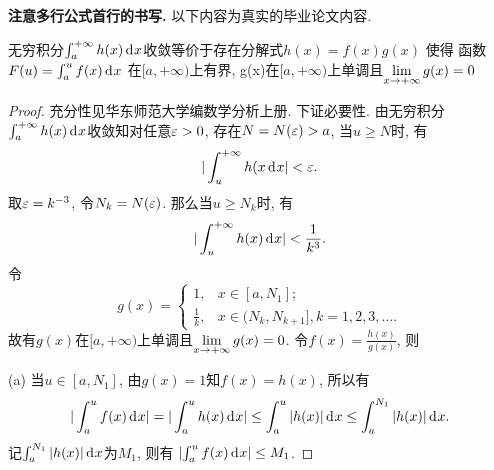 \documentclass[a4paper,12pt,twoside]{ctexart}
\begin{document}
    \textbf{注意多行公式首行的书写.} 以下内容为真实的毕业论文内容.
    \begin{theo}\label{theowom}
    无穷积分$\int_{a}^{+\infty}{h(x){\,\textup{d}}^{}x}$收敛等价于存在分解式$h(x)=f(x)g(x)$ 使得
    函数$F(u)=\int_{a}^{u}{f(x){\,\textup{d}}^{}x}$
    在$[a, +\infty)$上有界, g(x)在$[a, +\infty)$上单调且$\displaystyle\lim_{x\to+\infty}g(x)=0$
    \end{theo}

\begin{proof}
    充分性见华东师范大学编数学分析上册. 下证必要性.
    由无穷积分$\int_{a}^{+\infty}{h(x){\,\textup{d}}^{}x}$收敛知对任意$\varepsilon>0$, 存在$N=N(\varepsilon)>a$, 当$u\ge N$时, 有
        $$\vert\int_u^{+\infty}h(x{\,\textup{d}}^{}x\vert<\varepsilon.$$
    取$\varepsilon=k^{-3}$, 令$N_k=N(\varepsilon)$.  那么当$u\ge N_k$时, 有
        $$\vert\int_u^{+\infty}h(x){\,\textup{d}}^{}x\vert<\frac{1}{k^3}.$$
    令
$$
g(x)=\begin{cases}
    1,&x\in[a, N_1];\\
    \frac{1}{k},&x\in(N_k, N_{k+1}], k=1,2,3,\dots.
    \end{cases}
$$
故有$g(x)$在$[a, +\infty)$上单调且$\displaystyle\lim_{x\to+\infty}g(x)=0$. 令$f(x)=\frac{h(x)}{g(x)}$, 则

    (a) 当$u\in[a, N_1]$, 由$g(x)=1$知$f(x)=h(x)$, 所以有
    $$\vert\int_{a}^{u}{f(x){\,\textup{d}}^{}x}\vert=\vert\int_{a}^{u}{h(x){\,\textup{d}}^{}x}\vert \le\int_{a}^{u}\vert{h(x)}\vert{\,\textup{d}}^{}x\le\int_{a}^{N_1}\vert h(x)\vert{\,\textup{d}}^{}x.$$
    记$\int_{a}^{N_1}\vert h(x)\vert{\,\textup{d}}^{}x$为$ M_1$, 则有 ${\vert{\int_{a}^{u}{f(x){\,\textup{d}}^{}x}}\vert}\leq M_1$.


\end{proof}
\end{document}
